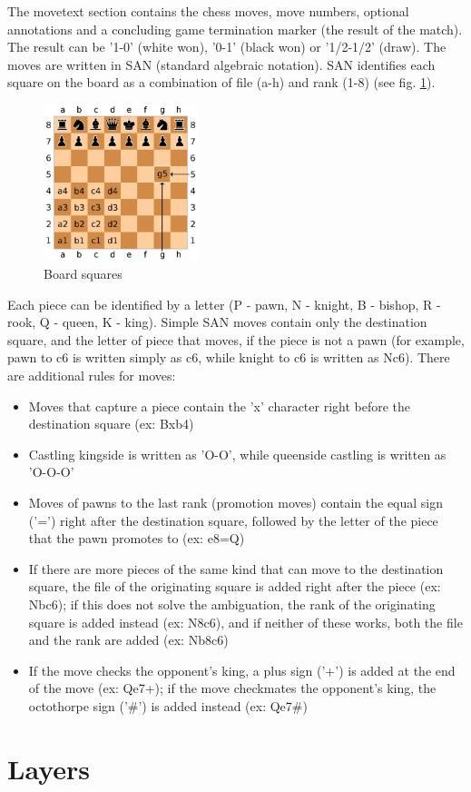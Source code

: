 The movetext section contains the chess moves, move numbers, optional annotations and a concluding game termination marker (the result of the match). The result can be '1-0' (white won), '0-1' (black won) or '1/2-1/2' (draw). The moves are written in SAN (standard algebraic notation). SAN identifies each square on the board as a combination of file (a-h) and rank (1-8) (see fig. \ref{fig:boardSquares}).

\begin{figure}[h]
    \centering
    \includegraphics[width=0.4\textwidth]{figures/board-squares.png}
    \caption{Board squares}
    \label{fig:boardSquares}
\end{figure}

Each piece can be identified by a letter (P - pawn, N - knight, B - bishop, R - rook, Q - queen, K - king). Simple SAN moves contain only the destination square, and the letter of piece that moves, if the piece is not a pawn (for example, pawn to c6 is written simply as c6, while knight to c6 is written as Nc6). There are additional rules for moves:
\begin{itemize}
    \item Moves that capture a piece contain the 'x' character right before the destination square (ex: Bxb4)
    \item Castling kingside is written as 'O-O', while queenside castling is written as 'O-O-O'
    \item Moves of pawns to the last rank (promotion moves) contain the equal sign ('=') right after the destination square, followed by the letter of the piece that the pawn promotes to (ex: e8=Q)
    \item If there are more pieces of the same kind that can move to the destination square, the file of the originating square is added right after the piece (ex: Nbc6); if this does not solve the ambiguation, the rank of the originating square is added instead (ex: N8c6), and if neither of these works, both the file and the rank are added (ex: Nb8c6)
    \item If the move checks the opponent's king, a plus sign ('+') is added at the end of the move (ex: Qe7+); if the move checkmates the opponent's king, the octothorpe sign ('\#') is added instead (ex: Qe7\#)
\end{itemize}
\cite{edwards1994standard}

\section{Layers}
\label{sec:ch4sec2}